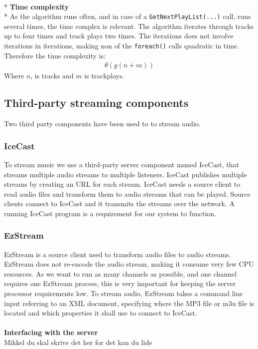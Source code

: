 \documentclass[a4paper,11pt,report]{article}
\begin{document}
\textbf{ } \\*
\textbf{Time complexity} \\*
As the algorithm runs often, and in case of a \texttt{GetNextPlayList(...)} call, runs several times, the time complex is relevant. The algorithm iterates through tracks up to four times and track plays two times. The iterations does not involve iterations in iterations, making non of the \texttt{foreach()} calls quadratic in time. Therefore the time complexity is: 
\begin{align*}
\theta (g(n + m))
\end{align*}
Where \begin{math}n\end{math}, is tracks and \begin{math}m\end{math} is trackplays.

\subsection{Third-party streaming components}
Two third party components have been used to to stream audio.
\subsubsection{IceCast}
To stream music we use a third-party server component named IceCast\cite{IceCast}, that streams multiple audio streams to multiple listeners. IceCast publishes multiple streams by creating an URL for each stream. IceCast needs a source client to read audio files and transform them to audio streams that can be played. Source clients connect to IceCast and it transmits the streams over the network. A running IceCast program is a requirement for our system to function.
\subsubsection{EzStream}
EzStream\cite{EzStream} is a source client used to transform audio files to audio streams. EzStream does not re-encode the audio stream, making it consume very few CPU resources. As we want to run as many channels as possible, and one channel requires one EzStream process, this is very important for keeping the server processor requirements low. To stream audio, EzStream takes a command line input referring to an XML document, specifying where the MP3 file or m3u file is located and which properties it shall use to connect to IceCast. \\ \\
\textbf{Interfacing with the server} \\
Mikkel du skal skrive det her for det kan du lide
\end{document}
